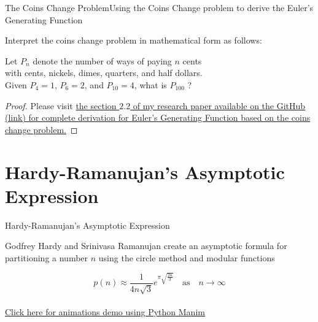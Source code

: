 \documentclass{beamer}
\begin{document}
    \begin{frame}{The Coins Change Problem}{Using the Coins Change problem to derive the Euler’s Generating Function}
        \begin{definition}
            Interpret the coins change problem in mathematical form as follows:
            \begin{center}{Let \( P_n \) denote the number of ways of paying \(n\) cents \\ with cents, nickels, dimes, quarters, and half dollars.\\ Given \(P_4=1\), \(P_6=2\), and \(P_{10}=4\), what is \(P_{100}\) ?}
            \end{center}
        \end{definition}
        \begin{proof}
            Please visit \href {https://github.com/ethan201not404/Math-Mentorship-2024/blob/main/2024MathMentorshipByEthanLi.pdf}{the section $2.2$ of my research paper available on the GitHub (link) for complete derivation for Euler's Generating Function based on the coins change problem.}
        \end{proof}
    \end{frame}

    \section{Hardy-Ramanujan’s Asymptotic Expression}
    \begin{frame}{Hardy-Ramanujan’s Asymptotic Expression}
        \begin{definition}
            Godfrey Hardy and Srinivasa Ramanujan create an asymptotic formula for partitioning a number \(n\) using the circle method and modular functions
        \end{definition}
        \begin{equation}
            p(n) \approx \frac{1}{4n\sqrt{3}} e^{\pi \sqrt{\frac{2n}{3}}} \quad \text{as} \quad n \to \infty
        \end{equation} \\
        \centering \href{https://youtu.be/UYjqhT5xnsY}{Click here for animations demo using Python Manim}\
    \end{frame}

\end{document}
